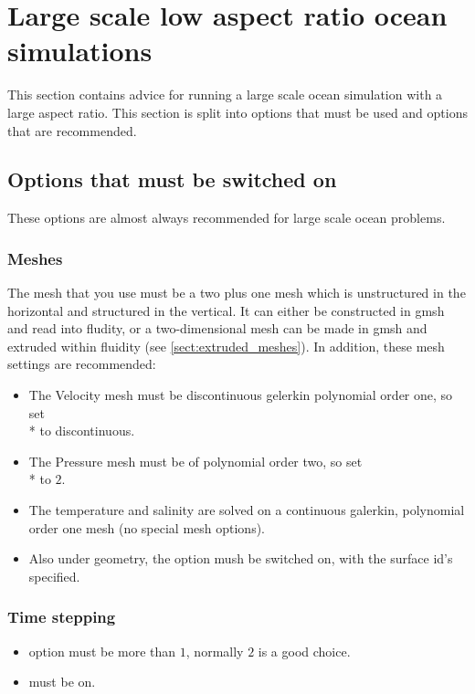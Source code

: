 \section{Large scale low aspect ratio ocean simulations}

This section contains advice for running a large scale ocean simulation with a large aspect ratio. This section is split into options that must be used and options that are recommended.

\subsection{Options that must be switched on}
These options are almost always recommended for large scale ocean problems.

\subsubsection{Meshes}

The mesh that you use must be a two plus one mesh which is unstructured in the horizontal and structured in the vertical.  It can either be constructed in gmsh and read into fludity, or a two-dimensional mesh can be made in gmsh and extruded within fluidity (see \ref{sect:extruded_meshes}). In addition, these mesh settings are recommended:
\begin{itemize}
\item The Velocity mesh must be discontinuous gelerkin polynomial order one, so set \\*  to discontinuous.  
\item The Pressure mesh must be of polynomial order two, so set 
\\*   to $2$.  
\item The temperature and salinity are solved on a continuous galerkin, polynomial order one mesh (no special mesh options).
\item Also under geometry, the  option mush be switched on, with the surface id's specified.
\end{itemize}

\subsubsection{Time stepping}
\begin{itemize}
\item {} option must be more than $1$, normally $2$ is a good choice.
\item {} must be on.
\end{itemize}

